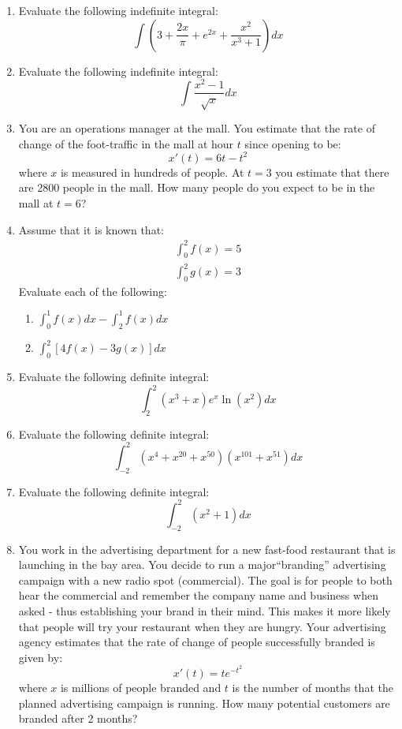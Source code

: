 \documentclass[letterpaper,12pt,fleqn]{article}
\begin{document}
\begin{enumerate}[left=0pt]
\item Evaluate the following indefinite integral:
  \[\int\left(3+\frac{2x}{\pi}+e^{2x}+\frac{x^2}{x^3+1}\right)dx\]

\item Evaluate the following indefinite integral:
  \[\int\frac{x^2-1}{\sqrt{x}}dx\]

\item You are an operations manager at the mall.  You estimate that the rate of change of the foot-traffic
  in the mall at hour \(t\) since opening to be:
  \[x'(t)=6t-t^2\]
  where \(x\) is measured in hundreds of people.  At \(t=3\) you estimate that there are 2800 people in the mall.
  How many people do you expect to be in the mall at \(t=6\)?

\item Assume that it is known that:
  \begin{gather*}
    \int_0^2 f(x)=5 \\
    \int_0^2 g(x)=3
  \end{gather*}
  Evaluate each of the following:\
  \begin{enumerate}
  \item\(\displaystyle \int_0^1 f(x)dx-\int_2^1 f(x)dx\) \\
  \item\(\displaystyle\int_0^2[4f(x)-3g(x)]dx\)
  \end{enumerate}
  
\item Evaluate the following definite integral:
  \[\int_{2}^{2}(x^3+x)e^x\ln(x^2)dx\]

\item Evaluate the following definite integral:
  \[\int_{-2}^{2}(x^4+x^{20}+x^{50})(x^{101}+x^{51})dx\]

\item Evaluate the following definite integral:
  \[\int_{-2}^{2}(x^2+1)dx\]

\item You work in the advertising department for a new fast-food restaurant that is launching in the bay area.  You
  decide to run a major``branding'' advertising campaign with a new radio spot (commercial).  The goal is for
  people to both hear the commercial and remember the company name and business when asked - thus establishing your
  brand in their mind.  This makes it more likely that people will try your restaurant when they are hungry.  Your
  advertising agency estimates that the rate of change of people successfully branded is given by:
  \[x'(t)=te^{-t^2}\]
  where \(x\) is millions of people branded and \(t\) is the number of months that the planned advertising campaign
  is running.  How many potential customers are branded after 2 months?
  

\end{enumerate}
\end{document}
